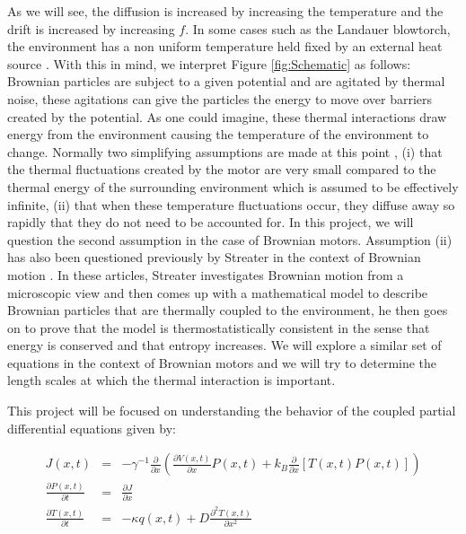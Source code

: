 As we will see, the diffusion is increased by increasing the temperature and the drift is increased by increasing $f$. In some cases such as the Landauer blowtorch, the environment has a non uniform temperature held fixed by an external heat source \cite{Landauer1988}. With this in mind, we interpret Figure \ref{fig:Schematic} as follows: Brownian particles are subject to a given potential and are agitated by thermal noise, these agitations can give the particles the energy to move over barriers created by the potential. As one could imagine, these thermal interactions draw energy from the environment causing the temperature of the environment to change. Normally two simplifying assumptions are made at this point \cite{Reimann2001}, (i) that the thermal fluctuations created by the motor are very small compared to the thermal energy of the surrounding environment which is assumed to be effectively infinite, (ii) that when these temperature fluctuations occur, they diffuse away so rapidly that they do not need to be accounted for. In this project, we will question the second assumption in the case of Brownian motors. Assumption (ii) has also been questioned previously by Streater in the context of Brownian motion \cite{Streater1997, Streater1997a}. In these articles, Streater investigates Brownian motion from a microscopic view and then comes up with a mathematical model to describe Brownian particles that are thermally coupled to the environment, he then goes on to prove that the model is thermostatistically consistent in the sense that energy is conserved and that entropy increases. We will explore a similar set of equations in the context of Brownian motors and we will try to determine the length scales at which the thermal interaction is important.

This project will be focused on understanding the behavior of the coupled partial differential equations given by:

\begin{eqnarray}
J(x, t) &=& -\gamma^{-1} \frac{\partial}{\partial x} \left ( \frac{\partial V(x, t)}{\partial x} P(x, t) + k_B \frac{\partial}{\partial x} \left [T(x, t) P(x, t) \right] \right )  \\
\frac{\partial P(x, t)}{\partial t} &=& \frac{\partial J}{\partial x} \label{eqn:Smoluchowski} \\
\frac{\partial T(x, t)}{\partial t} &=& -\kappa q(x, t) + D \frac{\partial^2 T(x, t)}{\partial x^2} \label{eqn:TemperatureEvolution}
\end{eqnarray}

